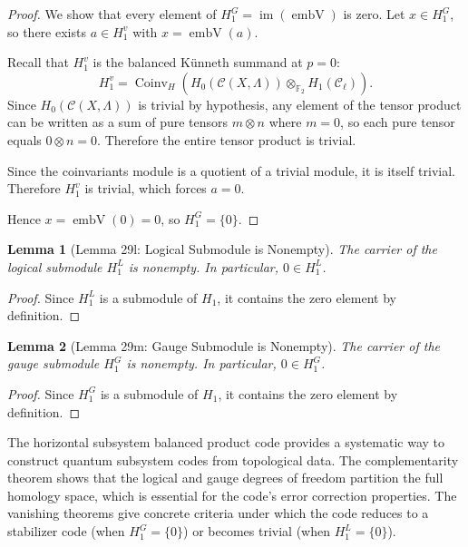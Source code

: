\documentclass[11pt]{article}
\theoremstyle{plain}
\newtheorem*{lemma}{Lemma}
\theoremstyle{definition}
\theoremstyle{remark}
\begin{document}
\begin{proof}
We show that every element of $H_1^G = \operatorname{im}(\operatorname{embV})$ is zero. Let $x \in H_1^G$, so there exists $a \in H_1^v$ with $x = \operatorname{embV}(a)$.

Recall that $H_1^v$ is the balanced Künneth summand at $p = 0$:
\[
  H_1^v = \operatorname{Coinv}_H(H_0(\mathcal{C}(X,\Lambda)) \otimes_{\mathbb{F}_2} H_1(\mathcal{C}_\ell)).
\]
Since $H_0(\mathcal{C}(X,\Lambda))$ is trivial by hypothesis, any element of the tensor product can be written as a sum of pure tensors $m \otimes n$ where $m = 0$, so each pure tensor equals $0 \otimes n = 0$. Therefore the entire tensor product is trivial.

Since the coinvariants module is a quotient of a trivial module, it is itself trivial. Therefore $H_1^v$ is trivial, which forces $a = 0$.

Hence $x = \operatorname{embV}(0) = 0$, so $H_1^G = \{0\}$.
\end{proof}

\begin{lemma}[Lemma 29l: Logical Submodule is Nonempty]
The carrier of the logical submodule $H_1^L$ is nonempty. In particular, $0 \in H_1^L$.
\end{lemma}

\begin{proof}
Since $H_1^L$ is a submodule of $H_1$, it contains the zero element by definition.
\end{proof}

\begin{lemma}[Lemma 29m: Gauge Submodule is Nonempty]
The carrier of the gauge submodule $H_1^G$ is nonempty. In particular, $0 \in H_1^G$.
\end{lemma}

\begin{proof}
Since $H_1^G$ is a submodule of $H_1$, it contains the zero element by definition.
\end{proof}

The horizontal subsystem balanced product code provides a systematic way to construct quantum subsystem codes from topological data. The complementarity theorem shows that the logical and gauge degrees of freedom partition the full homology space, which is essential for the code's error correction properties. The vanishing theorems give concrete criteria under which the code reduces to a stabilizer code (when $H_1^G = \{0\}$) or becomes trivial (when $H_1^L = \{0\}$).
\end{document}
